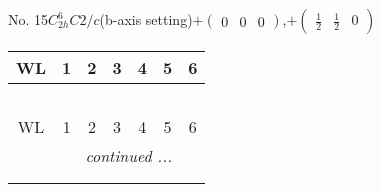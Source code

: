 \documentclass[fleqn,9pt,landscape]{jsarticle}
\begin{document}
\newpage
No. 15\quad$C_{2h}^{6}$\quad$C2/c$\quad(b-axis setting)\quad[ monoclinic ]\quad$+\begin{pmatrix} 0 & 0 & 0 \end{pmatrix}$,\quad $+\begin{pmatrix} \frac{1}{2} & \frac{1}{2} & 0 \end{pmatrix}$
\begin{center}
\renewcommand{\arraystretch}{1.2}
\begin{longtable}{ccccccc}
 \hline \hline
WL & 1 & 2 & 3 & 4 & 5 & 6 \\ \hline \endfirsthead

\multicolumn{6}{l}{\tablename\ \thetable{}} \\
 \hline \hline
WL & 1 & 2 & 3 & 4 & 5 & 6 \\ \hline \endhead

 \hline \hline
\multicolumn{6}{r}{\footnotesize\it continued ...} \\ \endfoot

 \hline \hline
\multicolumn{6}{r}{} \\ \endlastfoot


\end{longtable}
\end{center}
\end{document}
